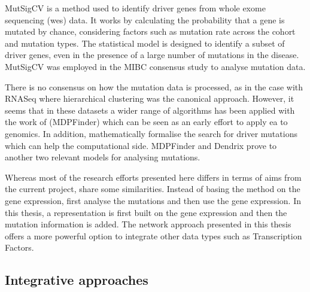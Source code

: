 MutSigCV \citep{Lawrence2013-pl} is a method used to identify driver genes from whole exome sequencing (\acrshort{wes}) data. It works by calculating the probability that a gene is mutated by chance, considering factors such as mutation rate across the cohort and mutation types. The statistical model is designed to identify a subset of driver genes, even in the presence of a large number of mutations in the disease. MutSigCV was employed in the MIBC consensus study \citep{Kamoun2020-tj} to analyse mutation data.

There is no consensus on how the mutation data is processed, as in the case with RNASeq where hierarchical clustering was the canonical approach. However, it seems that in these datasets a wider range of algorithms has been applied with the work of \citet{Zhao2012-wj} (MDPFinder) which can be seen as an early effort to apply \acrshort{ea} to genomics. In addition, \citet{Vandin2012-cf} mathematically formalise the search for driver mutations which can help the computational side. MDPFinder and Dendrix prove to another two relevant models for analysing mutations. 

Whereas most of the research efforts presented here differs in terms of aims from the current project, \citet{Zhao2012-wj} share some similarities. Instead of basing the method on the gene expression, \citet{Zhao2012-wj} first analyse the mutations and then use the gene expression. In this thesis, a representation is first built on the gene expression and then the mutation information is added. The network approach presented in this thesis offers a more powerful option to integrate other data types such as Transcription Factors.


\subsection{Integrative approaches} \label{s:lit:multi-view}

\vspace{3mm}
\vspace{3mm}

